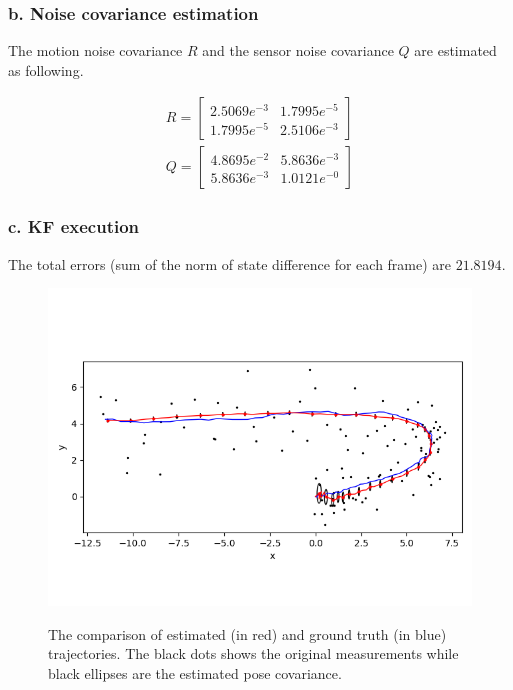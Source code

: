 \documentclass{article}
\theoremstyle{definition} %
\begin{document}
\subsubsection*{b. Noise covariance estimation}
The motion noise covariance $R$ and the sensor noise covariance $Q$ are estimated as following.

\begin{align*}
    R = 
    \begin{bmatrix}
        2.5069e^{-3} & 1.7995e^{-5}\\
        1.7995e^{-5} & 2.5106e^{-3}
    \end{bmatrix}\\
    Q = 
    \begin{bmatrix}
        4.8695e^{-2} & 5.8636e^{-3}\\
        5.8636e^{-3} & 1.0121e^{-0}
    \end{bmatrix}
\end{align*}

\subsubsection*{c. KF execution}
The total errors (sum of the norm of state difference for each frame) are $21.8194$.

\begin{figure}[H]
    \centering
        \textsf{\includegraphics[width=0.9\columnwidth]{kf.png}}
        \caption{The comparison of estimated (in red) and ground truth (in blue) trajectories. The black dots shows the original measurements while black ellipses are the estimated pose covariance.}
        \label{fig:kf}
\end{figure}
\end{document}
